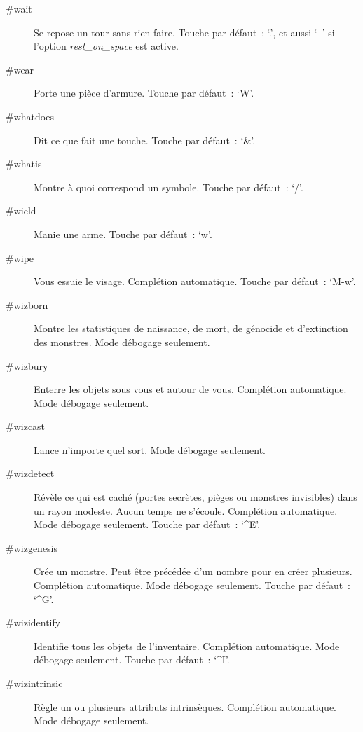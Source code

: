 \documentclass[titlepage]{article}
\begin{document}
\begin{description}
\item[{\#wait}]
Se repose un tour sans rien faire.
Touche par défaut~: `.', et aussi `~' si l'option
\textit{rest\_on\_space}
est active.

\item[{\#wear}]
Porte une pièce d'armure.
Touche par défaut~: `W'.

\item[{\#whatdoes}]
Dit ce que fait une touche.
Touche par défaut~: `\&'.

\item[{\#whatis}]
Montre à quoi correspond un symbole.
Touche par défaut~: `/'.

\item[{\#wield}]
Manie une arme.
Touche par défaut~: `w'.

\item[{\#wipe}]
Vous essuie le visage.
Complétion automatique.
Touche par défaut~: `M-w'.

\item[{\#wizborn}]
Montre les statistiques de naissance, de mort, de génocide et
d'extinction des monstres.
Mode débogage seulement.

\item[{\#wizbury}]
Enterre les objets sous vous et autour de vous.
Complétion automatique.
Mode débogage seulement.

\item[{\#wizcast}]
Lance n'importe quel sort.
Mode débogage seulement.

\item[{\#wizdetect}]
Révèle ce qui est caché (portes secrètes, pièges ou monstres invisibles)
dans un rayon modeste.
Aucun temps ne s'écoule.
Complétion automatique.
Mode débogage seulement.
Touche par défaut~: `\textasciicircum{}E'.

\item[{\#wizgenesis}]
Crée un monstre.
Peut être précédée d'un nombre pour en créer plusieurs.
Complétion automatique.
Mode débogage seulement.
Touche par défaut~: `\textasciicircum{}G'.

\item[{\#wizidentify}]
Identifie tous les objets de l'inventaire.
Complétion automatique.
Mode débogage seulement.
Touche par défaut~: `\textasciicircum{}I'.

\item[{\#wizintrinsic}]
Règle un ou plusieurs attributs intrinsèques.
Complétion automatique.
Mode débogage seulement.


\end{description}
\end{document}
